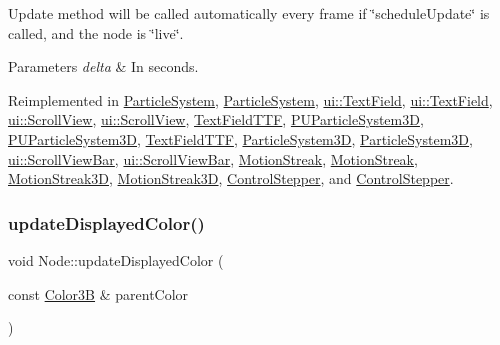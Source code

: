 Update method will be called automatically every frame if \char`\"{}schedule\+Update\char`\"{} is called, and the node is \char`\"{}live\char`\"{}. 
\begin{DoxyParams}{Parameters}
{\em delta} & In seconds. \\
\hline
\end{DoxyParams}


Reimplemented in \hyperlink{classParticleSystem_ac2b03d34a27150678a2737453ad1b7e3}{Particle\+System}, \hyperlink{classParticleSystem_a11a1c88736ddcd626ba8039b4268e82e}{Particle\+System}, \hyperlink{classui_1_1TextField_a7684f9503909dfc66085922bd52ec449}{ui\+::\+Text\+Field}, \hyperlink{classui_1_1TextField_a9caf0239e6855d3f608946b432b9ad59}{ui\+::\+Text\+Field}, \hyperlink{classui_1_1ScrollView_a4daad841add32c92b12e8c4c909b2b2e}{ui\+::\+Scroll\+View}, \hyperlink{classui_1_1ScrollView_a15b50cbbccdeff8dd34e8d0ab6ea82f7}{ui\+::\+Scroll\+View}, \hyperlink{classTextFieldTTF_a81ad55bca952a4927d3c4acfe8385030}{Text\+Field\+T\+TF}, \hyperlink{classPUParticleSystem3D_a42ba23b8909057126e8a9606f9cd4e8c}{P\+U\+Particle\+System3D}, \hyperlink{classPUParticleSystem3D_a9fdfe542cd05fcf270644dff49f81857}{P\+U\+Particle\+System3D}, \hyperlink{classTextFieldTTF_a004230b3dc3f90069b3094152e7c8eb0}{Text\+Field\+T\+TF}, \hyperlink{classParticleSystem3D_a446b0819b60fb46ce308e3d17e7625b0}{Particle\+System3D}, \hyperlink{classParticleSystem3D_a04fb4f09a517f393b5deb8174b964e40}{Particle\+System3D}, \hyperlink{classui_1_1ScrollViewBar_a9584b184a09bc1bf24f1a8805641294b}{ui\+::\+Scroll\+View\+Bar}, \hyperlink{classui_1_1ScrollViewBar_a26112897dfbfd6d3d727337f65177f1f}{ui\+::\+Scroll\+View\+Bar}, \hyperlink{classMotionStreak_a03d1e1113084f8e91b537539e7c19b9c}{Motion\+Streak}, \hyperlink{classMotionStreak_a915b84eec6e1e4576d9aa0c1e6528fe7}{Motion\+Streak}, \hyperlink{classMotionStreak3D_a3d336bcb41bd598ba73389378b278382}{Motion\+Streak3D}, \hyperlink{classMotionStreak3D_a195dbdebb5c5d55d3d09c4e5dc716a91}{Motion\+Streak3D}, \hyperlink{classControlStepper_a29a2d69a159c790691365db8a9f87d33}{Control\+Stepper}, and \hyperlink{classControlStepper_a29a2d69a159c790691365db8a9f87d33}{Control\+Stepper}.

\mbox{\label{classNode_ac733bae7b9590f8da746cbc3d1337a2f}} 
\subsubsection{\texorpdfstring{update\+Displayed\+Color()}{updateDisplayedColor()}\hspace{0.1cm}{\footnotesize\ttfamily [1/2]}}
{\footnotesize\ttfamily void Node\+::update\+Displayed\+Color (\begin{DoxyParamCaption}\item[{const \hyperlink{structColor3B}{Color3B} \&}]{parent\+Color }\end{DoxyParamCaption})\hspace{0.3cm}{\ttfamily [virtual]}}

